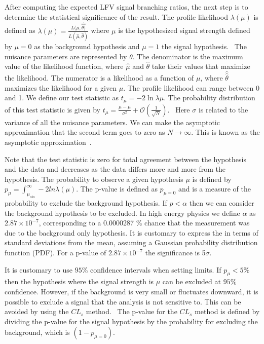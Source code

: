 \documentclass[oneside, letterpaper, oldfontcommands]{memoir}
\begin{document}
\qquad After computing the expected LFV signal branching ratios, the next step is to determine the statistical significance of the result. The profile likelihood $\lambda(\mu)$ is defined as  $\lambda(\mu) = \frac{L(\mu,\hat{\hat{\theta)}}}{L(\hat{\mu},\hat{\theta})}$ where $\mu$ is the hypothesized signal strength defined by $\mu=0$ as the background hypothesis and $\mu=1$ the signal hypothesis.~\cite{Cowan:2010js} 
The nuisance parameters are represented by $\theta$. The denominator is the maximum value of the likelihood function, where $\hat{\mu}$ and $\hat{\theta}$ take their values that maximize the likelihood. The numerator is a likelihood as a function of $\mu$, where $\hat{\hat{\theta}}$ maximizes the likelihood for a given $\mu$. The profile likelihood can range between 0 and 1. 
We define our test statistic as $t_{\mu} = -2\ln\lambda\mu$. The probability distribution of this test statistic is given by $t_{\mu} = \frac{\mu-\hat{\mu}}{\sigma^2} + \mathcal{O}(\frac{1}{\sqrt{N}})$.~\cite{wald1943tests} 
Here $\sigma$ is related to the variance of all the nuisance parameters. We can make the asymptotic approximation that the second term goes to zero as $N \rightarrow \infty$. This is known as the asymptotic approximation~\cite{Cowan:2010js}.

\qquad Note that the test statistic is zero for total agreement between the hypothesis and the data and decreases as the data differs more and more from the hypothesis. The probability to observe a given hypothesis $\mu$ is defined by $p_{\mu} = \int_{\mu_{obs}}^{\infty} - 2 ln \lambda(\mu)$. The p-value is defined as $p_{\mu=0}$ and is a measure of the probability to exclude the background hypothesis. If $p<\alpha$ then we can consider the background hypothesis to be excluded. In high energy physics we define $\alpha$ as $2.87 \times 10^{-7}$, corresponding to a 0.0000287 \% chance that the measurement was due to the background only hypothesis. It is customary to express the in terms of standard deviations from the mean, assuming a Gaussian probability distribution function (PDF). For a p-value of $2.87 \times 10^{-7}$ the significance is 5$\sigma$. 

\qquad It is customary to use $95\%$ confidence intervals when setting limits. If $p_{\mu} < 5\%$ then the hypothesis where the signal strength is $\mu$ can be excluded at $95\%$ confidence. However, if the background is very small or fluctuates downward, it is possible to exclude a signal that the analysis is not sensitive to. This can be avoided by using the $CL_{s}$ method.~\cite{Read:451614} The p-value for the $CL_{s}$ method is defined by dividing the p-value for the signal hypothesis by the probability for excluding the background, which is $(1-p_{\mu=0})$.
\end{document}
